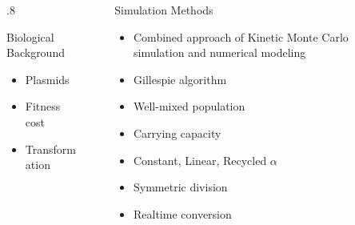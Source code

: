 \documentclass[final]{beamer}
\newlength{\sepwid}
\newlength{\onecolwid}
\begin{document}
\begin{frame}[t]
\begin{block}
\begin{columns}[t]
\begin{column}{\sepwid}\end{column} %

\begin{column}{.8\onecolwid}
  \begin{alertblock}{Biological Background}
    \begin{itemize}
      \item Plasmids
      \item Fitness cost
      \item Transformation
    \end{itemize}
  \end{alertblock}
\end{column}

\begin{column}{\sepwid}\end{column} %

\begin{column}{\onecolwid}
  \begin{alertblock}{Simulation Methods}
    \begin{itemize}
      \item Combined approach of Kinetic Monte Carlo simulation and numerical modeling
      \item Gillespie algorithm
      \item Well-mixed population
      \item Carrying capacity
      \item Constant, Linear, Recycled $\alpha$
      \item Symmetric division
      \item Realtime conversion
    \end{itemize}
  \end{alertblock}
\end{column}
\end{columns} %
\end{block}



\end{frame}
\end{document}
